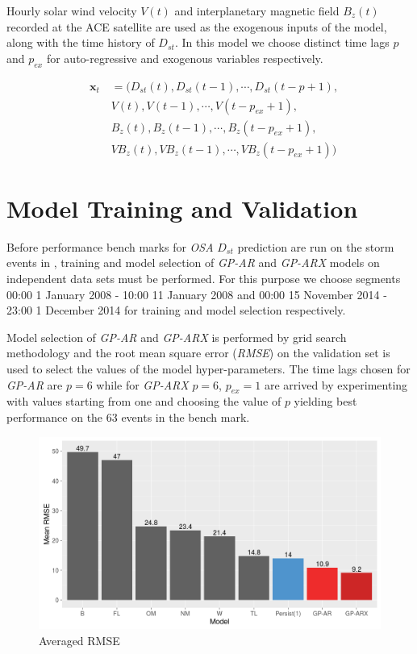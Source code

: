 \documentclass[referee,a4paper,12pt,traditabstract]{swsc}
\begin{document}
\begin{linenumbers}
Hourly solar wind velocity $V(t)$ and interplanetary magnetic field $B_z(t)$ recorded at the ACE satellite are used as the exogenous inputs of the model, along with the time history of $D_{st}$. In this model we choose distinct time lags $p$ and $p_{ex}$ for auto-regressive and exogenous variables respectively.
    
\begin{eqnarray*}
        & \mathbf{x}_t & = (D_{st}(t), D_{st}(t-1), \cdots , D_{st}(t-p+1), \\
        & \ \ \ \ \ & V(t), V(t-1), \cdots, V(t-p_{ex}+1),\\
        & \ \ \ \ \ & B_{z}(t), B_{z}(t-1), \cdots, B_{z}(t-p_{ex}+1),\\
        & \ \ \ \ \ & V B_{z}(t), V B_{z}(t-1), \cdots, V B_{z}(t-p_{ex}+1))
\end{eqnarray*}

\section{Model Training and Validation}

Before performance bench marks for \emph{OSA} $D_{st}$ prediction are run on the storm events in \cite{Ji2012}, training and model selection of \emph{GP-AR} and \emph{GP-ARX} models on independent data sets must be performed. For this purpose we choose segments 00:00 1 January 2008 - 10:00 11 January 2008 and 00:00 15 November 2014 - 23:00 1 December 2014 for training and model selection respectively.

Model selection of \emph{GP-AR} and \emph{GP-ARX} is performed by grid search methodology and the root mean square error (\emph{RMSE}) on the validation set is used to select the values of the model hyper-parameters. The time lags chosen for \emph{GP-AR} are $p = 6$ while for \emph{GP-ARX} $p=6$, $p_{ex} = 1$ are arrived by experimenting with values starting from one and choosing the value of $p$ yielding best performance on the 63 events in the bench mark.   

\begin{figure}
   \centering
   \includegraphics[width=\textwidth]{Compare_RMSE.png}
      \caption{Averaged RMSE}
         \label{fig:rmse}
   \end{figure}


\end{linenumbers}
\end{document}
